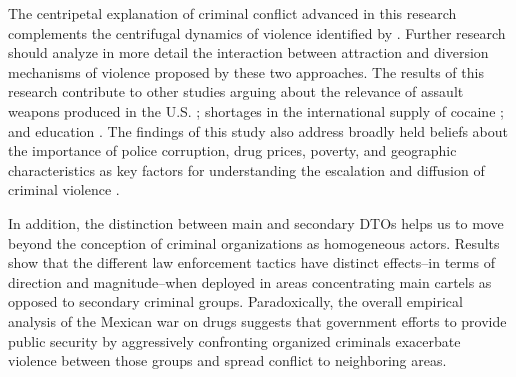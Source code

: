 \documentclass[12pt,letterpaper]{article}
\begin{document}
The centripetal explanation of criminal conflict advanced in this research complements the centrifugal dynamics of violence identified by \citet{Dell2011}. Further research should analyze in more detail the interaction between attraction and diversion mechanisms of violence proposed by these two approaches. The results of this research contribute to other studies arguing about the relevance of assault weapons produced in the U.S. \citep{Dube2013}; shortages in the international supply of cocaine \citep{Castillo2014}; and education \citep{Ingram2014}. The findings of this study also address broadly held beliefs about the importance of police corruption, drug prices, poverty, and geographic characteristics as key factors for understanding the escalation and diffusion of criminal violence \citep{Morris2012,Kilmer2010,Collier2004,Fajnzylber2000a}. 

In addition, the distinction between main and secondary DTOs helps us to move beyond the conception of criminal organizations as homogeneous actors. Results show that the different law enforcement tactics have distinct effects--in terms of direction and magnitude--when deployed in areas concentrating main cartels as opposed to secondary criminal groups. Paradoxically, the overall empirical analysis of the Mexican war on drugs suggests that government efforts to provide public security by aggressively confronting organized criminals exacerbate violence between those groups and spread conflict to neighboring areas. 










\newpage

\theendnotes


\newpage

\newpage 

\end{document}
